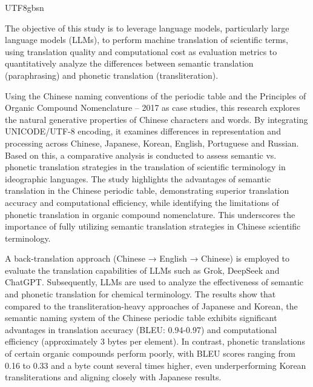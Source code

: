 \documentclass[conference]{IEEEtran}
\begin{document}
\begin{CJK*}{UTF8}{gbsn}

The objective of this study is to leverage language models, particularly large language models (LLMs), to perform machine translation of scientific terms, using translation quality and computational cost as evaluation metrics to quantitatively analyze the differences between semantic translation (paraphrasing) and phonetic translation (transliteration).

Using the Chinese naming conventions of the periodic table and the Principles of Organic Compound Nomenclature – 2017 as case studies, this research explores the natural generative properties of Chinese characters and words. By integrating UNICODE/UTF-8 encoding, it examines differences in representation and processing across Chinese, Japanese, Korean, English, Portuguese and Russian. Based on this, a comparative analysis is conducted to assess semantic vs. phonetic translation strategies in the translation of scientific terminology in ideographic languages. The study highlights the advantages of semantic translation in the Chinese periodic table, demonstrating superior translation accuracy and computational efficiency, while identifying the limitations of phonetic translation in organic compound nomenclature. This underscores the importance of fully utilizing semantic translation strategies in Chinese scientific terminology.

A back-translation approach (Chinese → English → Chinese) is employed to evaluate the translation capabilities of LLMs such as Grok, DeepSeek and ChatGPT. Subsequently, LLMs are used to analyze the effectiveness of semantic and phonetic translation for chemical terminology. The results show that compared to the transliteration-heavy approaches of Japanese and Korean, the semantic naming system of the Chinese periodic table exhibits significant advantages in translation accuracy (BLEU: 0.94-0.97) and computational efficiency (approximately 3 bytes per element). In contrast, phonetic translations of certain organic compounds perform poorly, with BLEU scores ranging from 0.16 to 0.33 and a byte count several times higher, even underperforming Korean transliterations and aligning closely with Japanese results.


\end{CJK*}
\end{document}
